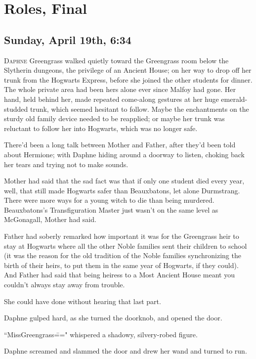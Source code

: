 \chapter{Roles, Final}

\section{Sunday, April 19th, 6:34\pm}

\lettrine{D}{aphne} Greengrass walked quietly toward the Greengrass room below the Slytherin dungeons, the privilege of an Ancient House; on her way to drop off her trunk from the Hogwarts Express, before she joined the other students for dinner. The whole private area had been hers alone ever since Malfoy had gone. Her hand, held behind her, made repeated come-along gestures at her huge emerald-studded trunk, which seemed hesitant to follow. Maybe the enchantments on the sturdy old family device needed to be reapplied; or maybe her trunk was reluctant to follow her into Hogwarts, which was no longer safe.

There'd been a long talk between Mother and Father, after they'd been told about Hermione; with Daphne hiding around a doorway to listen, choking back her tears and trying not to make sounds.

Mother had said that the sad fact was that if only one student died every year, well, that still made Hogwarts safer than Beauxbatons, let alone Durmstrang. There were more ways for a young witch to die than being murdered. Beauxbatons's Transfiguration Master just wasn't on the same level as McGonagall, Mother had said.

Father had soberly remarked how important it was for the Greengrass heir to stay at Hogwarts where all the other Noble families sent their children to school (it was the reason for the old tradition of the Noble families synchronizing the birth of their heirs, to put them in the same year of Hogwarts, if they could). And Father had said that being heiress to a Most Ancient House meant you couldn't always stay away from trouble.

She could have done without hearing that last part.

Daphne gulped hard, as she turned the doorknob, and opened the door.

``Miss\?Greengrass\===" whispered a shadowy, silvery-robed figure.

Daphne screamed and slammed the door and drew her wand and turned to run.


